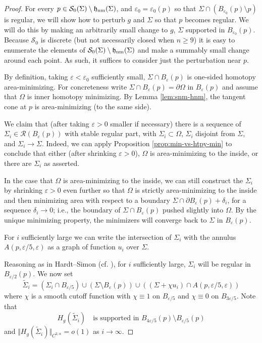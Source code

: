 \documentclass[12pt,twoside]{amsart}
\numberwithin{equation}{section}
\renewcommand{\geq}{\geqslant}
\renewcommand{\cR}{\mathcal R}
\newcommand{\cS}{\mathcal S}
\newcommand{\eps}{\varepsilon}
\DeclareMathOperator{\hnm}{\mathfrak{h}_\textnormal{nm}}
\begin{document}
\begin{proof}
For every $p \in \cS_0(\Sigma)\setminus \hnm(\Sigma)$, and $\eps_0=\eps_0(p)$ so that $\Sigma \cap (B_{\eps_0}(p)\setminus p)$ is regular, we will show how to perturb $g$ and $\Sigma$ so that $p$ becomes regular. We will do this by making an arbitrarily small change to $g$, $\Sigma$ supported in $B_{\eps_0}(p)$. Because $\cS_0$ is discrete (but not necessarily closed when $n\geq 9$) it is easy to enumerate the elements of $\cS_0(\Sigma)\setminus \hnm(\Sigma)$ and make a summably small change around each point. As such, it suffices to consider just the perturbation near $p$.

By definition, taking $\eps<\eps_0$ sufficiently small, $\Sigma \cap B_\eps(p)$ is one-sided homotopy area-minimizing. For concreteness write $\Sigma \cap B_\eps(p) = \partial \Omega$ in $B_\eps(p)$ and assume that $\Omega$ is inner homotopy minimizing. By Lemma \ref{lem:snm-hnm}, the tangent cone at $p$ is area-minimizing (to the same side). 

We claim that (after taking $\eps>0$ smaller if necessary) there is a sequence of $\Sigma_i\in\cR(B_\eps(p))$ with stable regular part, with $\Sigma_i \subset \Omega$, $\Sigma_i$ disjoint from $\Sigma$, and $\Sigma_i\to \Sigma$. Indeed, we can apply Proposition \ref{prop:min-vs-htpy-min} to conclude that either (after shrinking $\eps>0$), $\Omega$ is area-minimizing to the inside, or there are $\Sigma_i$ as asserted.

In the case that $\Omega$ is area-minimizing to the inside, we can still construct the $\Sigma_i$ by shrinking $\eps>0$ even further so that $\Omega$ is strictly area-minimizing to the inside and then minimizing area with respect to a boundary
$\Sigma \cap \partial B_\eps(p) + \delta_i$, for a sequence $\delta_i\to 0$;
i.e., the boundary of $\Sigma\cap B_\eps(p)$ pushed slightly into $\Omega$. By the unique minimizing property, the minimizers will converge back to $\Sigma$ in $B_\eps(p)$. 

For $i$ sufficiently large we can write the intersection of $\Sigma_i$
with the annulus $A(p,\eps/5,\eps)$ as a graph of function $u_i$
over $\Sigma$.

Reasoning as in Hardt--Simon \cite[Theorem 5.6]{HS} (cf. \cite[Theorem 3.1]{Liu}), for $i$ sufficiently large, $\Sigma_i$ will be regular in $B_{\eps/2}(p)$. We now set 
\[
\tilde\Sigma_i =(\Sigma_i \cap B_{\eps/5}) \cup (\Sigma\setminus B_\eps(p)) \cup ((\Sigma + \chi u_i)\cap A(p,\eps/5,\eps))
\]
where $\chi$ is a smooth cutoff function with $\chi\equiv1$ on $B_{\eps/5}$ and $\chi\equiv 0$ on $B_{3\eps/5}$. Note that
\[
H_g(\tilde\Sigma_i) \quad \text{is supported in $B_{4\eps/5}(p) \setminus B_{\eps/5}(p)$}
\]
and $\Vert H_g(\tilde \Sigma_i) \Vert_{C^{2,\alpha}} = o(1)$ as 
$i \to \infty$.


\end{proof}
\end{document}
